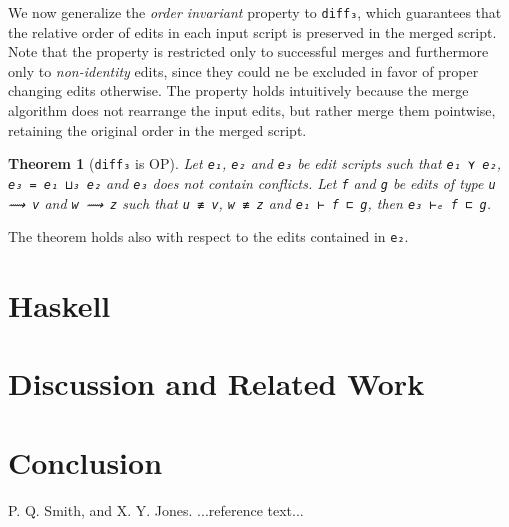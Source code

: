 \documentclass[preprint]{sigplanconf}
\theoremstyle{plain}
\newtheorem{thm}{Theorem}
\begin{document}
We now generalize the \emph{order invariant} property to
\texttt{diff₃}, which guarantees that the relative order of edits in
each input script is preserved in the merged script.
%
Note that the property is restricted only to successful merges and
furthermore only to \emph{non-identity} edits, since they could 
ne be excluded in favor of proper changing edits otherwise.
%
The property holds intuitively because the merge algorithm does not
rearrange the input edits, but rather merge them pointwise, retaining
the original order in the merged script.
%
\begin{thm}[\texttt{diff₃} is OP]
  Let \texttt{e₁}, \texttt{e₂} and \texttt{e₃} be edit scripts such
  that \texttt{e₁ ⋎ e₂}, \texttt{e₃ = e₁ ⊔₃ e₂} and \texttt{e₃} does not
  contain conflicts.
%
  Let \texttt{f} and \texttt{g} be edits of type \texttt{u ⟿ v} and
  \texttt{w ⟿ z} such that \texttt{u ≢ v}, \texttt{w ≢ z} and
  \texttt{e₁ ⊢ f ⊏ g}, then \texttt{e₃ ⊢ₑ f ⊏ g}.
\end{thm}
  The theorem holds also with respect to the edits contained in \texttt{e₂}.

\section{Haskell}
\label{sec:haskell}

\section{Discussion and Related Work}
\label{sec:related-work}

\section{Conclusion}
\label{sec:conclusion}









\begin{thebibliography}{}
\softraggedright

P. Q. Smith, and X. Y. Jones. ...reference text...

\end{thebibliography}

\listoftodos
\end{document}
